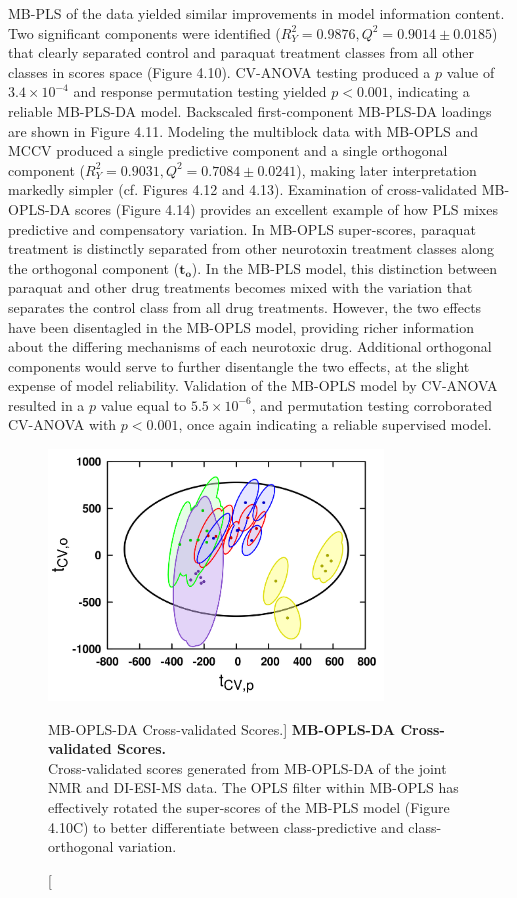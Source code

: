 \begin{doublespace}
MB-PLS of the data yielded similar improvements in model information content.
Two significant components were identified
($R^2_Y = 0.9876, Q^2 = 0.9014 \pm 0.0185$) that clearly separated control and
paraquat treatment classes from all other classes in scores space
(Figure 4.10). CV-ANOVA testing produced a $p$ value of $3.4 \times 10^{-4}$
and response permutation testing yielded $p < 0.001$, indicating a reliable
MB-PLS-DA model. Backscaled first-component MB-PLS-DA loadings are shown in
Figure 4.11. Modeling the multiblock data with MB-OPLS and MCCV produced a
single predictive component and a single orthogonal component
($R^2_Y = 0.9031, Q^2 = 0.7084 \pm 0.0241$), making later interpretation
markedly simpler (cf. Figures 4.12 and 4.13). Examination of cross-validated
MB-OPLS-DA scores (Figure 4.14) provides an excellent example of how PLS mixes
predictive and compensatory variation. In MB-OPLS super-scores, paraquat
treatment is distinctly separated from other neurotoxin treatment classes along
the orthogonal component ($\mathbf{t_o}$). In the MB-PLS model, this
distinction between paraquat and other drug treatments becomes mixed with the
variation that separates the control class from all drug treatments. However,
the two effects have been disentagled in the MB-OPLS model, providing richer
information about the differing mechanisms of each neurotoxic drug. Additional
orthogonal components would serve to further disentangle the two effects, at
the slight expense of model reliability. Validation of the MB-OPLS model by
CV-ANOVA resulted in a $p$ value equal to $5.5 \times 10^{-6}$, and permutation
testing corroborated CV-ANOVA with $p < 0.001$, once again indicating a
reliable supervised model.
\end{doublespace}

\begin{figure}
\includegraphics[width=3.5in]{figs/apps/14-mbopls-t.png}
\caption
      [MB-OPLS-DA Cross-validated Scores.]{
  {\bf MB-OPLS-DA Cross-validated Scores.}
  \\
  Cross-validated scores generated from MB-OPLS-DA of the joint \hnmr{} NMR
  and DI-ESI-MS data. The OPLS filter within MB-OPLS has effectively rotated
  the super-scores of the MB-PLS model (Figure 4.10C) to better differentiate
  between class-predictive and class-orthogonal variation.
}
\end{figure}

